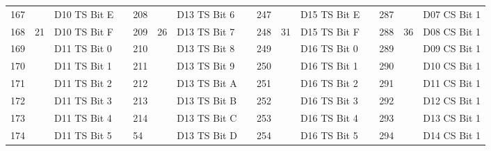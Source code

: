 \documentclass[]{article}
\begin{document}
\begin{landscape}
\begin{table}[]
\begin{tabular}{lllllllllllllll}
			167          &                      & D10 TS Bit E      &                    & 208          &                      & D13 TS Bit 6      &  & 247          &                      & D15 TS Bit E      &  & 287                      &                                            & D07 CS Bit 1             \\
			168          & \multirow{-8}{*}{21} & D10 TS Bit F      & \multirow{-9}{*}{} & 209          & \multirow{-8}{*}{26} & D13 TS Bit 7      &  & 248          & \multirow{-8}{*}{31} & D15 TS Bit F      &  & 288                      & \multirow{-8}{*}{36}                       & D08 CS Bit 1             \\ \cline{1-3} \cline{5-7} \cline{9-11} \cline{13-15} 
			169          &                      & D11 TS Bit 0      &                    & 210          &                      & D13 TS Bit 8      &  & 249          &                      & D16 TS Bit 0      &  & 289                      &                                            & D09 CS Bit 1             \\
			170          &                      & D11 TS Bit 1      &                    & 211          &                      & D13 TS Bit 9      &  & 250          &                      & D16 TS Bit 1      &  & 290                      &                                            & D10 CS Bit 1             \\
			171          &                      & D11 TS Bit 2      &                    & 212          &                      & D13 TS Bit A      &  & 251          &                      & D16 TS Bit 2      &  & 291                      &                                            & D11 CS Bit 1             \\
			172          &                      & D11 TS Bit 3      &                    & 213          &                      & D13 TS Bit B      &  & 252          &                      & D16 TS Bit 3      &  & 292                      &                                            & D12 CS Bit 1             \\
			173          &                      & D11 TS Bit 4      &                    & 214          &                      & D13 TS Bit C      &  & 253          &                      & D16 TS Bit 4      &  & 293                      &                                            & D13 CS Bit 1             \\
			174          &                      & D11 TS Bit 5      &                    & 54           &                      & D13 TS Bit D      &  & 254          &                      & D16 TS Bit 5      &  & 294                      &                                            & D14 CS Bit 1             \\

\end{tabular}
\end{table}
\end{landscape}
\end{document}
